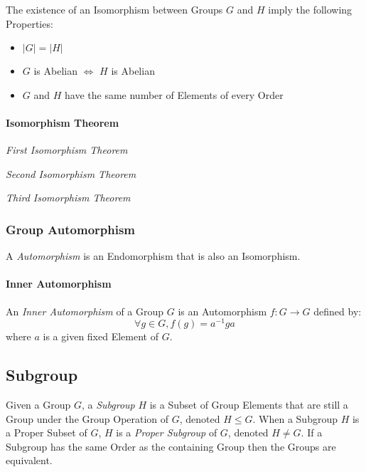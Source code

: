 The existence of an Isomorphism between Groups $G$ and $H$ imply the
following Properties:
\begin{itemize}
    \item $|G| = |H|$
    \item $G$ is Abelian $\Leftrightarrow$ $H$ is Abelian
    \item $G$ and $H$ have the same number of Elements of every Order
\end{itemize}



\paragraph{Isomorphism Theorem}\label{sec:isomorphism_theorem}\hfill

\emph{First Isomorphism Theorem}

\emph{Second Isomorphism Theorem}

\emph{Third Isomorphism Theorem}



\subsubsection{Group Automorphism}\label{sec:group_automorphism}

A \emph{Automorphism} is an Endomorphism that is also an Isomorphism.



\paragraph{Inner Automorphism}\label{sec:inner_automorphism}\hfill

An \emph{Inner Automorphism} of a Group $G$ is an Automorphism $f : G
\rightarrow G$ defined by:
\[
    \forall g \in G, f(g) = a^{-1}ga
\]
where $a$ is a given fixed Element of $G$.



\subsection{Subgroup}\label{sec:subgroup}

Given a Group $G$, a \emph{Subgroup} $H$ is a Subset of Group Elements
that are still a Group under the Group Operation of $G$, denoted $H
\leq G$. When a Subgroup $H$ is a Proper Subset of $G$, $H$ is a
\emph{Proper Subgroup} of $G$, denoted $H \neq G$. If a Subgroup has
the same Order as the containing Group then the Groups are equivalent.

